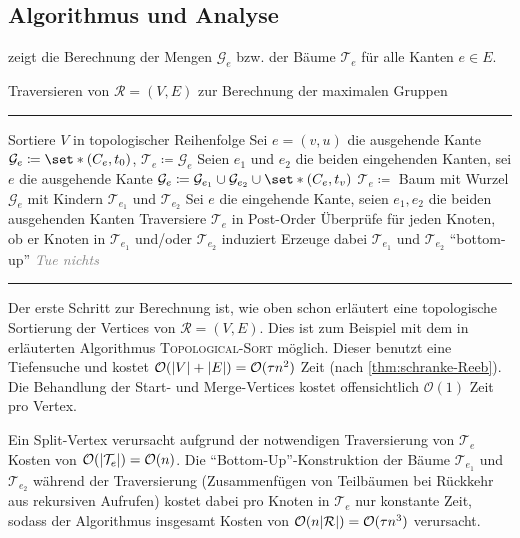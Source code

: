 \subsection{Algorithmus und Analyse} %
\label{sub:algorithmus_und_analyse}
 zeigt die Berechnung der Mengen $\mathcal{G}_e$ bzw. der Bäume $\mathcal{T}_e$ für alle Kanten $e \in E$.
\begin{algorithm}[hbtp]
	\caption{Traversieren von $\mathcal{R}=(V,E)$ zur Berechnung der maximalen Gruppen}\label{alg:max_groups}
	\vspace{.5em}
	\hrule\vspace{.5em}
	
	\begin{algorithmic}
		\State Sortiere $V$ in topologischer Reihenfolge
			\State Sei $e=(v,u)$ die ausgehende Kante
			\State $\mathcal{G}_e \coloneqq \set*{(C_e,t_0)}$, $\mathcal{T}_e \coloneqq \mathcal{G}_e$
			\State Seien $e_1$ und $e_2$ die beiden eingehenden Kanten, sei $e$ die ausgehende Kante
			\State $\mathcal{G}_e \coloneqq \mathcal{G}_{e_1} \cup \mathcal{G}_{e_2} \cup \set*{(C_e,t_v)}$
			\State $\mathcal{T}_e \coloneqq$ Baum mit Wurzel $\mathcal{G}_e$ mit Kindern $\mathcal{T}_{e_1}$ und $\mathcal{T}_{e_2}$
			\State Sei $e$ die eingehende Kante, seien $e_1,e_2$ die beiden ausgehenden Kanten
			\State Traversiere $\mathcal{T}_e$ in Post-Order
			\State Überprüfe für jeden Knoten, ob er Knoten in $\mathcal{T}_{e_1}$ und/oder $\mathcal{T}_{e_2}$ induziert
			\State Erzeuge dabei $\mathcal{T}_{e_1}$ und $\mathcal{T}_{e_2}$ \enquote{bottom-up}
			\State \textcolor{gray}{\emph{Tue nichts}}
			\EndIf
		\EndFor
		\EndProcedure
	\end{algorithmic}
	\hrule
\end{algorithm}

Der erste Schritt zur Berechnung ist, wie oben schon erläutert eine topologische Sortierung der Vertices von $\mathcal{R}=(V,E)$.
Dies ist zum Beispiel mit dem in \textcite[Sec.~22.4]{cormenIntroduction} erläuterten Algorithmus \textsc{Topological-Sort} möglich.
Dieser benutzt eine Tiefensuche und kostet $\mathcal{O}(\abs*{V} + \abs*{E}) = \mathcal{O}(\tau n^2)$ Zeit (nach \cref{thm:schranke-Reeb}).
Die Behandlung der Start- und Merge-Vertices kostet offensichtlich $\mathcal{O}(1)$ Zeit pro Vertex.

Ein Split-Vertex verursacht aufgrund der notwendigen Traversierung von $\mathcal{T}_e$ Kosten von $\mathcal{O}(\abs*{\mathcal{T}_e}) = \mathcal{O}(n)$.
Die \enquote{Bottom-Up}-Konstruktion der Bäume $\mathcal{T}_{e_1}$ und $\mathcal{T}_{e_2}$ während der Traversierung (Zusammenfügen von Teilbäumen bei Rückkehr aus rekursiven Aufrufen) kostet dabei pro Knoten in $\mathcal{T}_e$ nur konstante Zeit, sodass der Algorithmus insgesamt Kosten von $\mathcal{O}(n \abs*{\mathcal{R}}) = \mathcal{O}(\tau n^3)$ verursacht.

